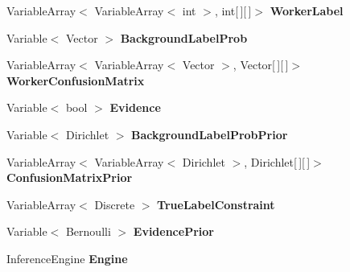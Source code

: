 \begin{DoxyCompactItemize}
\item 
\hypertarget{class_crowdsourcing_models_1_1_b_c_c_a725288eab6a1d504644e575538b8096f}{}Variable\+Array$<$ Variable\+Array$<$ int $>$, int\mbox{[}$\,$\mbox{]}\mbox{[}$\,$\mbox{]}$>$ {\bfseries Worker\+Label}\label{class_crowdsourcing_models_1_1_b_c_c_a725288eab6a1d504644e575538b8096f}

\item 
\hypertarget{class_crowdsourcing_models_1_1_b_c_c_aedd35546a335dd210693c23cdf33426b}{}Variable$<$ Vector $>$ {\bfseries Background\+Label\+Prob}\label{class_crowdsourcing_models_1_1_b_c_c_aedd35546a335dd210693c23cdf33426b}

\item 
\hypertarget{class_crowdsourcing_models_1_1_b_c_c_ac3423e1c181209e137446d9cfbed4a69}{}Variable\+Array$<$ Variable\+Array$<$ Vector $>$, Vector\mbox{[}$\,$\mbox{]}\mbox{[}$\,$\mbox{]}$>$ {\bfseries Worker\+Confusion\+Matrix}\label{class_crowdsourcing_models_1_1_b_c_c_ac3423e1c181209e137446d9cfbed4a69}

\item 
\hypertarget{class_crowdsourcing_models_1_1_b_c_c_a386f9905a19a7abaa35aec10517ad30f}{}Variable$<$ bool $>$ {\bfseries Evidence}\label{class_crowdsourcing_models_1_1_b_c_c_a386f9905a19a7abaa35aec10517ad30f}

\item 
\hypertarget{class_crowdsourcing_models_1_1_b_c_c_a3ef6845c2072f001f77835c1e891e958}{}Variable$<$ Dirichlet $>$ {\bfseries Background\+Label\+Prob\+Prior}\label{class_crowdsourcing_models_1_1_b_c_c_a3ef6845c2072f001f77835c1e891e958}

\item 
\hypertarget{class_crowdsourcing_models_1_1_b_c_c_a12a1e36fa58b81c5b06260b624dd315b}{}Variable\+Array$<$ Variable\+Array$<$ Dirichlet $>$, Dirichlet\mbox{[}$\,$\mbox{]}\mbox{[}$\,$\mbox{]}$>$ {\bfseries Confusion\+Matrix\+Prior}\label{class_crowdsourcing_models_1_1_b_c_c_a12a1e36fa58b81c5b06260b624dd315b}

\item 
\hypertarget{class_crowdsourcing_models_1_1_b_c_c_a3631ed583e4307a270b7b9b0c4f98d82}{}Variable\+Array$<$ Discrete $>$ {\bfseries True\+Label\+Constraint}\label{class_crowdsourcing_models_1_1_b_c_c_a3631ed583e4307a270b7b9b0c4f98d82}

\item 
\hypertarget{class_crowdsourcing_models_1_1_b_c_c_afc07115edd21cd40cc322e2bfcb0a5b3}{}Variable$<$ Bernoulli $>$ {\bfseries Evidence\+Prior}\label{class_crowdsourcing_models_1_1_b_c_c_afc07115edd21cd40cc322e2bfcb0a5b3}

\item 
\hypertarget{class_crowdsourcing_models_1_1_b_c_c_aafa91c4ced5cd1174a37b703cfc8b0b7}{}Inference\+Engine {\bfseries Engine}\label{class_crowdsourcing_models_1_1_b_c_c_aafa91c4ced5cd1174a37b703cfc8b0b7}

\end{DoxyCompactItemize}
